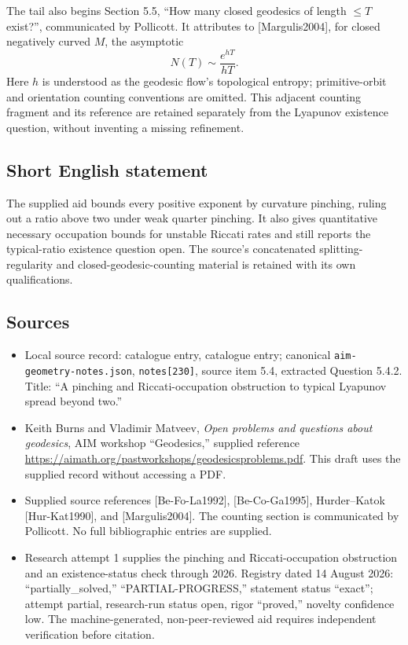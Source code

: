 \documentclass[11pt]{article}
\begin{document}
The tail also begins Section 5.5, ``How many closed geodesics of length \(\leq T\) exist?'', communicated by Pollicott. It attributes to [Margulis2004], for closed negatively curved \(M\), the asymptotic
\[
 N(T)\sim\frac{e^{hT}}{hT}.
\]
Here \(h\) is understood as the geodesic flow's topological entropy; primitive-orbit and orientation counting conventions are omitted. This adjacent counting fragment and its reference are retained separately from the Lyapunov existence question, without inventing a missing refinement.
\subsection{Short English statement}
The supplied aid bounds every positive exponent by curvature pinching, ruling out a ratio above two under weak quarter pinching. It also gives quantitative necessary occupation bounds for unstable Riccati rates and still reports the typical-ratio existence question open. The source's concatenated splitting-regularity and closed-geodesic-counting material is retained with its own qualifications.
\subsection{Sources}
\begin{itemize}
\item Local source record: catalogue entry, catalogue entry; canonical \texttt{aim-geometry-notes.json}, \texttt{notes[230]}, source item 5.4, extracted Question 5.4.2. Title: ``A pinching and Riccati-occupation obstruction to typical Lyapunov spread beyond two.''
\item Keith Burns and Vladimir Matveev, \emph{Open problems and questions about geodesics}, AIM workshop ``Geodesics,'' supplied reference \url{https://aimath.org/pastworkshops/geodesicsproblems.pdf}. This draft uses the supplied record without accessing a PDF.
\item Supplied source references [Be-Fo-La1992], [Be-Co-Ga1995], Hurder--Katok [Hur-Kat1990], and [Margulis2004]. The counting section is communicated by Pollicott. No full bibliographic entries are supplied.
\item Research attempt 1 supplies the pinching and Riccati-occupation obstruction and an existence-status check through 2026. Registry dated 14 August 2026: ``partially\_solved,'' ``PARTIAL-PROGRESS,'' statement status ``exact''; attempt partial, research-run status open, rigor ``proved,'' novelty confidence low. The machine-generated, non-peer-reviewed aid requires independent verification before citation.
\end{itemize}
\end{document}
